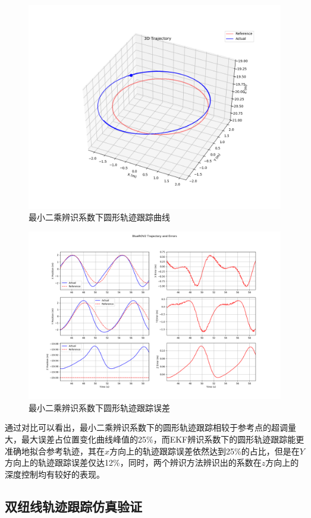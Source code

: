 \begin{figure}[hbt]
    \centering
    \includegraphics[width=0.8\linewidth]{images/chapter4/ls_circle_traj.png}
    \caption{最小二乘辨识系数下圆形轨迹跟踪曲线}
    \label{f.ls_circle_track_traj}
\end{figure}
\begin{figure}[hbt]
    \centering
    \includegraphics[width=0.8\linewidth]{images/chapter4/ls_circle_error.png}
    \caption{最小二乘辨识系数下圆形轨迹跟踪误差}
    \label{f.ls_circle_track_error}
\end{figure}

通过对比可以看出，最小二乘辨识系数下的圆形轨迹跟踪相较于参考点的超调量大，最大误差占位置变化曲线峰值的25\%，而EKF辨识系数下的圆形轨迹跟踪能更准确地拟合参考轨迹，其在$x$方向上的轨迹跟踪误差依然达到25\%的占比，但是在$Y$方向上的轨迹跟踪误差仅达12\%，同时，两个辨识方法辨识出的系数在$z$方向上的深度控制均有较好的表现。

\subsection{双纽线轨迹跟踪仿真验证}

